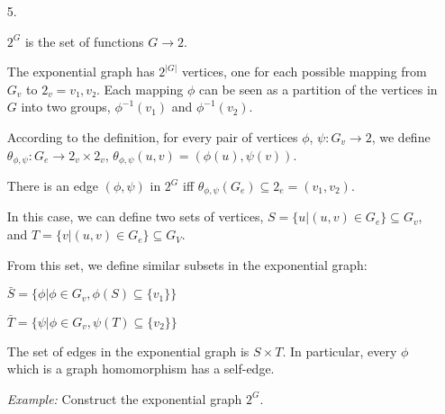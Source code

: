 \documentclass[a4paper,notitlepage]{article}
\begin{document}
\begin{enumerate}
\begin{enumerate}
\begin{proof}
\begin{description}
        Universality of ($(A^B)^C$)
        $$z = z^\prime$$

     \end{description}

     \end{proof}

   \end{enumerate}

   \item[ 5.]

     $2^G$ is the set of functions $G → 2$.

     The exponential graph has $2^{\vert G \vert }$ vertices, one for each
     possible mapping from $G_v$ to $2_v = {v₁,v₂}$. Each mapping $\phi$ can be
     seen as a partition of the vertices in $G$ into two groups, $\phi^{-1}(v_1)$
     and $\phi^{-1}(v_2)$.

     According to the definition, for every pair of vertices $\phi$,
     $\psi : G_v → 2$, we define
     $\theta_{\phi,\psi} : G_e → 2_v \times 2_v$,
     $\theta_{\phi,\psi}(u,v) = (\phi(u), \psi(v))$.

     There is an edge $(\phi, \psi)$ in $2^G$ iff $\theta_{\phi,\psi}(G_e) \subseteq 2_e = {(v_1,v_2)}$.

     In this case, we can define two sets of vertices, $S = \{ u \vert (u,v) \in G_e \} \subseteq G_v$, and
     $T = \{ v \vert (u,v) \in G_e \} \subseteq G_V$.

     From this set, we define similar subsets in the exponential graph:

     $\bar{S} = \{ \phi \vert \phi \in G_v, \phi(S) \subseteq \{ v_1 \} \}$

     $\bar{T} = \{ \psi \vert \phi \in G_v, \psi(T) \subseteq \{ v_2 \} \}$

     The set of edges in the exponential graph is $S \times T$. In particular,
     every $\phi$ which is a graph homomorphism has a self-edge.

     {\em Example:} Construct the exponential graph $2^G$. 
     
     \begin{multicols}{2}
     
     \begin{dot2tex}[neato]
       
     \end{dot2tex}
     
     \begin{dot2tex}[neato]
       
     \end{dot2tex}


\end{multicols}
\end{enumerate}
\end{document}
